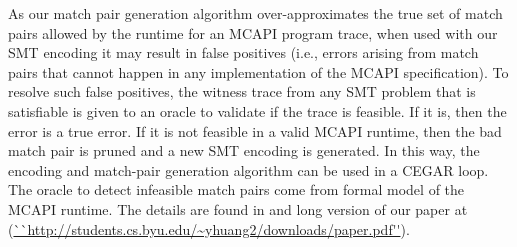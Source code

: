 As our match pair generation algorithm over-approximates the true set of match pairs allowed by the runtime for an MCAPI program trace, when used with our SMT encoding it may result in false positives (i.e.,  errors arising from match pairs that cannot happen in any implementation of the MCAPI specification). To resolve such false positives, the witness trace from any SMT problem that is satisfiable is given to an oracle to validate if the trace is feasible. If it is, then the error is a true error. If it is not feasible in a valid MCAPI runtime, then the bad match pair is pruned and a new SMT encoding is generated. In this way, the encoding and match-pair generation algorithm can be used in a CEGAR loop. The oracle to detect infeasible match pairs come from formal model of the MCAPI runtime. The details are found in \cite{morse:vmcai12} and long version of our paper at (\url{``http://students.cs.byu.edu/~yhuang2/downloads/paper.pdf''}).
